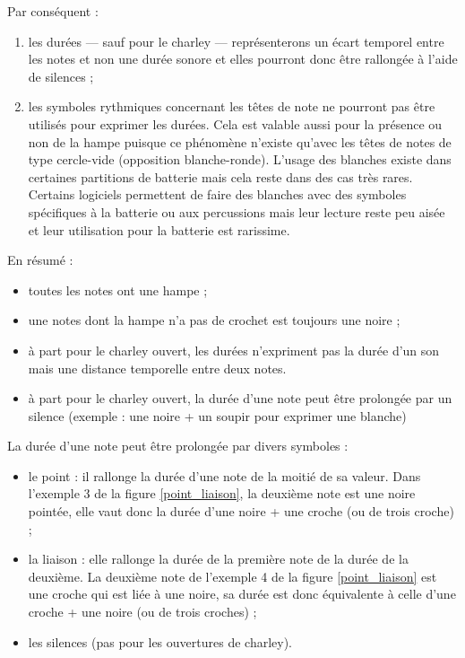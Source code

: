 Par conséquent :
\begin{enumerate}
    \item les durées — sauf pour le charley — représenterons un écart temporel
        entre les notes et non une durée sonore et elles pourront donc être
        rallongée à l’aide de silences ;
    \item les symboles rythmiques concernant les têtes de note ne pourront pas
        être utilisés pour exprimer les durées. Cela est valable aussi pour la
        présence ou non de la hampe puisque ce phénomène n’existe qu’avec les
        têtes de notes de type cercle-vide (opposition blanche-ronde). L’usage
        des blanches existe dans certaines partitions de batterie
        \cite{system_drums} mais cela reste dans des cas très rares. Certains
        logiciels permettent de faire des blanches avec des symboles
        spécifiques à la batterie ou aux percussions mais leur lecture reste
        peu aisée et leur utilisation pour la batterie est rarissime.\\
\end{enumerate}

En résumé :
\begin{itemize}
    \item toutes les notes ont une hampe ;
    \item une notes dont la hampe n’a pas de crochet est toujours une noire ;
    \item à part pour le charley ouvert, les durées n’expriment pas la durée
        d’un son mais une distance temporelle entre deux notes.
    \item à part pour le charley ouvert, la durée d’une note peut être
        prolongée par un silence (exemple : une noire + un soupir pour exprimer
        une blanche)\\
\end{itemize}
La durée d’une note peut être prolongée par divers symboles :
\begin{itemize}
	\item le point : il rallonge la durée d’une note de la moitié de sa valeur.
        Dans l’exemple 3 de la figure \ref{point_liaison}, la deuxième note
        est une noire pointée, elle vaut donc la durée d’une noire + une croche
        (ou de trois croche) ;
	\item la liaison : elle rallonge la durée de la première note de la durée
        de la deuxième. La deuxième note de l’exemple 4 de la figure
        \ref{point_liaison} est une croche qui est liée à une noire, sa durée
        est donc équivalente à celle d’une croche + une noire (ou de trois
        croches) ;
    \item les silences (pas pour les ouvertures de charley).\\
\end{itemize}

